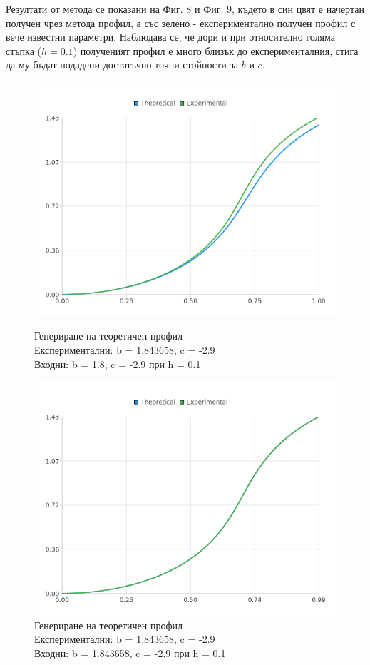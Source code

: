 \documentclass{article}
\begin{document}
Резултати от метода се показани на Фиг. 8 и Фиг. 9, където в син цвят е начертан получен чрез метода профил, а със зелено - експериментално получен профил с вече известни параметри. Наблюдава се, че дори и при относително голяма стъпка ($h = 0.1$) полученият профил е много близък до експерименталния, стига да му бъдат подадени достатъчно точни стойности за \(b\) и \(c\).

\begin{figure}[H]
\centering
\begin{minipage}{0.5\textwidth}
  \centering
  \includegraphics[width=1\linewidth]{app-theoretical-1.png}
  \caption{Генериране на теоретичен профил \protect\\ Експериментални: b = 1.843658, c = -2.9 \protect\\ Входни: b = 1.8, c = -2.9 при h = 0.1}
\end{minipage}%
\begin{minipage}{0.5\textwidth}
  \centering
  \includegraphics[width=1\linewidth]{app-theoretical-2.png}
  \caption{Генериране на теоретичен профил \protect\\ Експериментални: b = 1.843658, c = -2.9 \protect\\ Входни: b = 1.843658, c = -2.9 при h = 0.1}
\end{minipage}
\end{figure}
\end{document}
